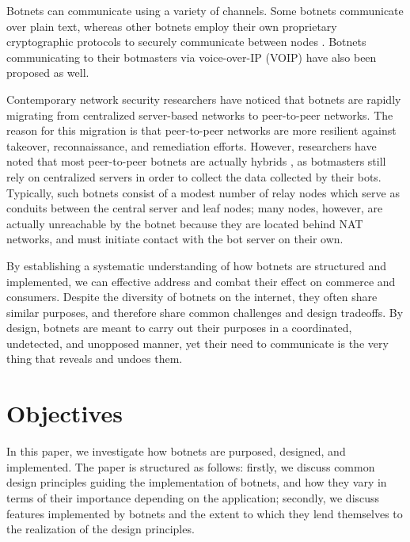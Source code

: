 \documentclass{acm_proc_article-sp}
\begin{document}
Botnets can communicate using a variety of channels.  Some botnets communicate over plain text, whereas other botnets employ their own proprietary cryptographic protocols to securely communicate between nodes \cite{stone:takeover}.  Botnets communicating to their botmasters via voice-over-IP (VOIP) have also been proposed \cite{defcon:voip} as well.  

Contemporary network security researchers have noticed that botnets are rapidly migrating from centralized server-based networks to peer-to-peer networks.  The reason for this migration is that peer-to-peer networks are more resilient against takeover, reconnaissance, and remediation efforts.  However, researchers have noted that most peer-to-peer botnets are actually hybrids \cite{defcon:prowling}, as botmasters still rely on centralized servers in order to collect the data collected by their bots.  Typically, such botnets consist of a modest number of relay nodes which serve as conduits between the central server and leaf nodes; many nodes, however, are actually unreachable by the botnet because they are located behind NAT networks, and must initiate contact with the bot server on their own. 

By establishing a systematic understanding of how botnets are structured and implemented, we can effective address and combat their effect on commerce and consumers. Despite the diversity of botnets on the internet, they often share similar purposes, and therefore share common challenges and design tradeoffs.  By design, botnets are meant to carry out their purposes in a coordinated, undetected, and unopposed manner, yet their need to communicate is the very thing that reveals and undoes them.


\section{Objectives}

In this paper, we investigate how botnets are purposed, designed, and implemented.  The paper is structured as follows: firstly, we discuss common design principles guiding the implementation of botnets, and how they vary in terms of their importance depending on the application; secondly, we discuss features implemented by botnets and the extent to which they lend themselves to the realization of the design principles.  
\end{document}

